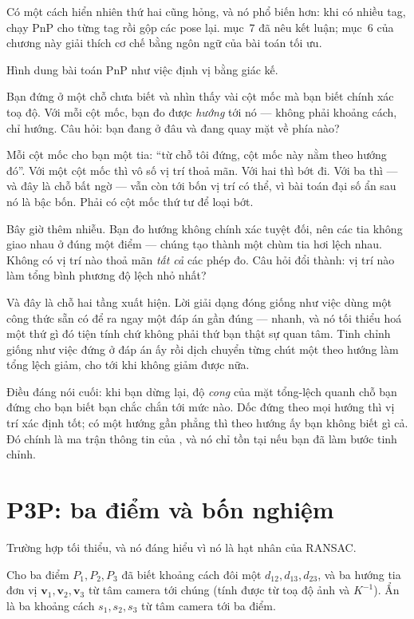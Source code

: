 \documentclass[../../marker.tex]{subfiles}
\begin{document}
Có một cách hiển nhiên thứ hai cũng hỏng, và nó phổ biến hơn: khi có nhiều tag, chạy PnP cho từng tag rồi gộp các pose lại.  mục~7 đã nêu kết luận; mục~6 của chương này giải thích cơ chế bằng ngôn ngữ của bài toán tối ưu.

\begin{trucgiac}
Hình dung bài toán PnP như việc định vị bằng giác kế.

Bạn đứng ở một chỗ chưa biết và nhìn thấy vài cột mốc mà bạn biết chính xác toạ độ. Với mỗi cột mốc, bạn đo được \emph{hướng} tới nó --- không phải khoảng cách, chỉ hướng. Câu hỏi: bạn đang ở đâu và đang quay mặt về phía nào?

Mỗi cột mốc cho bạn một tia: ``từ chỗ tôi đứng, cột mốc này nằm theo hướng đó''. Với một cột mốc thì vô số vị trí thoả mãn. Với hai thì bớt đi. Với ba thì --- và đây là chỗ bất ngờ --- vẫn còn tới bốn vị trí có thể, vì bài toán đại số ẩn sau nó là bậc bốn. Phải có cột mốc thứ tư để loại bớt.

Bây giờ thêm nhiễu. Bạn đo hướng không chính xác tuyệt đối, nên các tia không giao nhau ở đúng một điểm --- chúng tạo thành một chùm tia hơi lệch nhau. Không có vị trí nào thoả mãn \emph{tất cả} các phép đo. Câu hỏi đổi thành: vị trí nào làm tổng bình phương độ lệch nhỏ nhất?

Và đây là chỗ hai tầng xuất hiện. Lời giải dạng đóng giống như việc dùng một công thức sẵn có để ra ngay một đáp án gần đúng --- nhanh, và nó tối thiểu hoá một thứ gì đó tiện tính chứ không phải thứ bạn thật sự quan tâm. Tinh chỉnh giống như việc đứng ở đáp án ấy rồi dịch chuyển từng chút một theo hướng làm tổng lệch giảm, cho tới khi không giảm được nữa.

Điều đáng nói cuối: khi bạn dừng lại, độ \emph{cong} của mặt tổng-lệch quanh chỗ bạn đứng cho bạn biết bạn chắc chắn tới mức nào. Dốc đứng theo mọi hướng thì vị trí xác định tốt; có một hướng gần phẳng thì theo hướng ấy bạn không biết gì cả. Đó chính là ma trận thông tin của , và nó chỉ tồn tại nếu bạn đã làm bước tinh chỉnh.
\end{trucgiac}

\section{P3P: ba điểm và bốn nghiệm}

Trường hợp tối thiểu, và nó đáng hiểu vì nó là hạt nhân của RANSAC.

Cho ba điểm \(P_1, P_2, P_3\) đã biết khoảng cách đôi một \(d_{12}, d_{13}, d_{23}\), và ba hướng tia đơn vị \(\mathbf{v}_1, \mathbf{v}_2, \mathbf{v}_3\) từ tâm camera tới chúng (tính được từ toạ độ ảnh và \(K^{-1}\)). Ẩn là ba khoảng cách \(s_1, s_2, s_3\) từ tâm camera tới ba điểm.
\end{document}
